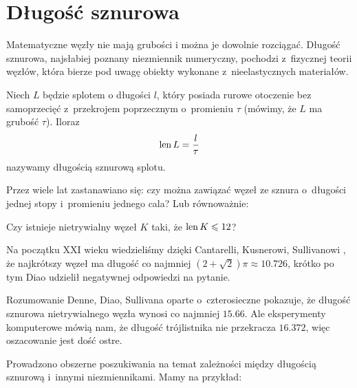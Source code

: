 
\section{Długość sznurowa}
%
Matematyczne węzły nie mają grubości i można je dowolnie rozciągać.
Długość sznurowa, najsłabiej poznany niezmiennik numeryczny, pochodzi z~fizycznej teorii węzłów, która bierze pod uwagę obiekty wykonane z~nieelastycznych materiałów.

\begin{definition}
    Niech $L$ będzie splotem o długości $l$, który posiada rurowe otoczenie bez samoprzecięć z~przekrojem poprzecznym o~promieniu $\tau$ (mówimy, że $L$ ma grubość $\tau$).
    Iloraz
    \begin{equation}
        \operatorname{len} L = \frac l \tau
    \end{equation}
    nazywamy długością sznurową splotu.
\end{definition}

Przez wiele lat zastanawiano się: czy można zawiązać węzeł ze sznura o~długości jednej stopy i~promieniu jednego cala?
Lub równoważnie:

\begin{conjecture}
    Czy istnieje nietrywialny węzeł $K$ taki, że $\operatorname{len} K \leqslant 12$?
\end{conjecture}

Na początku XXI wieku wiedzieliśmy dzięki Cantarelli, Kusnerowi, Sullivanowi \cite{cantarella2002}, że najkrótszy węzeł ma długość co najmniej $(2 + \sqrt 2)\pi \approx 10.726$, krótko po tym Diao \cite[s. 14]{diao2003} udzielił negatywnej odpowiedzi na pytanie.
%
%
%
%

\begin{example}
    Rozumowanie Denne, Diao, Sullivana \cite{denne2006} oparte o~czterosieczne pokazuje, że długość sznurowa nietrywialnego węzła wynosi co najmniej $15.66$.
Ale eksperymenty komputerowe mówią nam, że długość trójlistnika nie przekracza $16.372$, więc oszacowanie jest dość ostre.
\end{example}

Prowadzono obszerne poszukiwania na temat zależności między długością sznurową i~innymi niezmiennikami.
Mamy na przykład:

